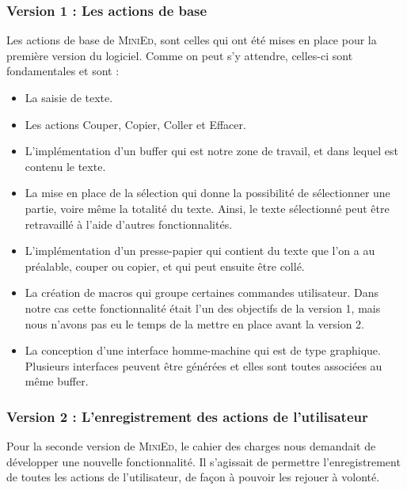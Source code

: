 \documentclass[a4paper]{article}
\begin{document}
		\vspace{0.5cm}

			\subsubsection{Version 1 : Les actions de base}

			Les actions de base de \textsc{MiniEd}, sont celles qui ont été mises en place pour la première version du logiciel. Comme on peut s'y attendre, celles-ci sont fondamentales et sont :

			\begin{itemize}
				\item La saisie de texte.

				\item Les actions Couper, Copier, Coller et Effacer.

				\item L'implémentation d’un buffer qui est notre zone de travail, et dans lequel est contenu le texte.

				\item La mise en place de la sélection qui donne la possibilité de sélectionner une partie, voire même la totalité du texte. Ainsi, le texte sélectionné peut être retravaillé à l’aide d’autres fonctionnalités.

				\item L’implémentation d’un presse-papier qui contient du texte que l’on a au préalable, couper ou copier, et qui peut ensuite être collé.

				\item La création de macros qui groupe certaines commandes utilisateur. Dans notre cas cette fonctionnalité était l'un des objectifs de la version 1, mais nous n'avons pas eu le temps de la mettre en place avant la version 2.

				\item La conception d’une interface homme-machine qui est de type graphique. Plusieurs interfaces peuvent être générées et elles sont toutes associées au même buffer.
			\end{itemize}

			\subsubsection{Version 2 : L'enregistrement des actions de l'utilisateur}

			Pour la seconde version de \textsc{MiniEd}, le cahier des charges nous demandait de développer une nouvelle fonctionnalité. Il s'agissait de permettre l'enregistrement de toutes les actions de l'utilisateur, de façon à pouvoir les rejouer à volonté.
\end{document}
